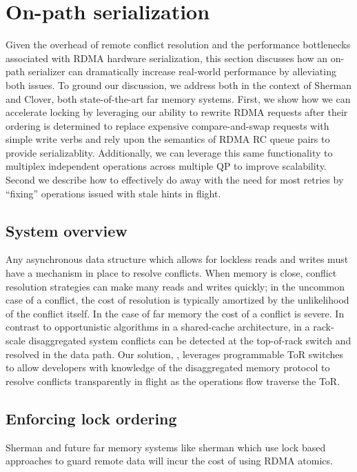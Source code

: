 \section{On-path serialization}

Given the overhead of remote conflict resolution and the performance bottlenecks
associated with RDMA hardware serialization, this section discusses how an
on-path serializer can dramatically increase real-world performance by
alleviating both issues. To ground our discussion, we address both in the
context of Sherman and Clover, both state-of-the-art far memory systems.  First,
we show how we can accelerate locking by leveraging our ability to rewrite RDMA
requests after their ordering is determined to replace expensive
compare-and-swap requests with simple write verbs and rely upon the semantics of
RDMA RC queue pairs to provide serializablity.  Additionally, we can leverage
this same functionality to multiplex independent operations across multiple QP
to improve scalability.  Second we describe how to effectively do away with the
need for most retries by ``fixing'' operations issued with stale hints in
flight.  

\subsection{System overview}

Any asynchronous data structure which allows for lockless reads and
writes must have a mechanism in place to resolve conflicts. When
memory is close, conflict resolution strategies can make many reads
and writes quickly; in the uncommon case of a conflict, the cost of
resolution is typically amortized by the unlikelihood of the conflict
itself. In the case of far memory the cost of a conflict is severe. In
contrast to opportunistic algorithms in a shared-cache architecture,
in a rack-scale disaggregated system conflicts can be detected at the
top-of-rack switch and resolved in the data path. Our solution,
\sword, leverages programmable ToR switches to allow developers with
knowledge of the disaggregated memory protocol to resolve conflicts
transparently in flight as the operations flow traverse the ToR.

\subsection{Enforcing lock ordering}

Sherman and future far memory systems like sherman which use lock based
approaches to guard remote data will incur the cost of using RDMA atomics. 

